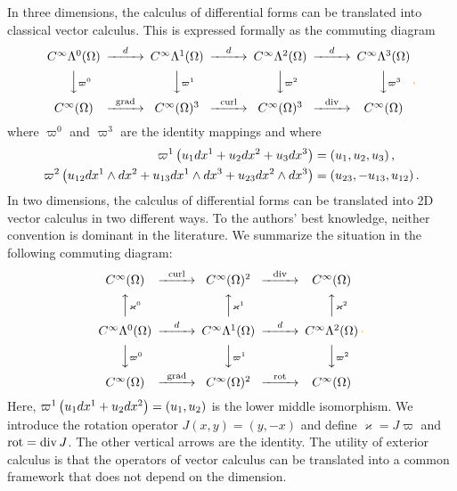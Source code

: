 \documentclass[10pt,letterpaper]{article}
\newcommand\cye[1]{%
  \protect\leavevmode
  \begingroup
    \color{red!35!yellow}%
    #1%
  \endgroup
}
\begin{document}
\begin{remark}
    In three dimensions, 
    the calculus of differential forms can be translated into classical vector calculus. 
    This is expressed formally as the commuting diagram 
    \begin{gather*}
    \begin{CD}
        C^\infty\Alt^0(\Omega) @>{\cartan}>> C^\infty\Alt^1(\Omega) @>{\cartan}>> C^\infty\Alt^2(\Omega) @>{\cartan}>> C^\infty\Alt^3(\Omega) 
        \\
        @VV{\varpi^{0}}V 
        @VV{\varpi^{1}}V 
        @VV{\varpi^{2}}V 
        @VV{\varpi^{3}}V 
        \\
        C^\infty(\Omega) @>{\grad}>> C^\infty(\Omega)^{3} @>{\curl}>> C^\infty(\Omega)^{3} @>{\divergence}>> C^\infty(\Omega)
    \end{CD}
    \cye{\, ,}
    \end{gather*}
    where $\varpi^{0}$ and $\varpi^{3}$ are the identity mappings and where 
    \begin{align*}
     \varpi^{1}\left( u_1 dx^{1} + u_2 dx^{2} + u_3 dx^{3} \right) 
     &= 
     \left( u_1, u_2, u_3 \right), 
     \\
     \varpi^{2}\left( u_{12} dx^{1} \wedge dx^{2} + u_{13} dx^{1} \wedge dx^{3} + u_{23} dx^{2} \wedge dx^{3} \right) 
     &= 
     \left( u_{23}, - u_{13}, u_{12} \right).   
    \end{align*}
    In two dimensions, 
    the calculus of differential forms can be translated into 2D vector calculus in two different ways. 
    To the authors' best knowledge, neither convention is dominant in the literature.
    We summarize the situation in the following commuting diagram: 
    \begin{gather*} 
    \begin{CD}
        C^\infty(\Omega) @>{\curl}>> C^\infty(\Omega)^{2} @>{\divergence}>> C^\infty(\Omega)
        \\
        @AA{\varkappa^{0}}A 
        @AA{\varkappa^{1}}A 
        @AA{\varkappa^{2}}A 
        \\
        C^\infty\Alt^0(\Omega) @>{\cartan}>> C^\infty\Alt^1(\Omega) @>{\cartan}>> C^\infty\Alt^2(\Omega) 
        \\
        @VV{\varpi^{0}}V 
        @VV{\varpi^{1}}V 
        @VV{\varpi^{2}}V 
        \\
        C^\infty(\Omega) @>{\grad}>> C^\infty(\Omega)^{2} @>{\rot}>> C^\infty(\Omega)
    \end{CD}
    \cye{\,.}
    \end{gather*}
    Here, $\varpi^{1}\left( u_1 dx^{1} + u_2 dx^{2} \right) = \left( u_1, u_2 \right)$ is the lower middle isomorphism. We introduce the rotation operator $J(x,y) = (y,-x)$ and define $\varkappa = J \varpi$ and $\operatorname{rot} = \operatorname{div} J$.
    The other vertical arrows are the identity. 
    The utility of exterior calculus is that the operators of vector calculus can be translated into a common framework that does not depend on the dimension.
\end{remark}
\end{document}
